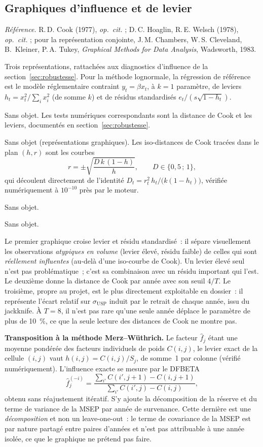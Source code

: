 \documentclass[a4paper,11pt]{article}
\newcommand{\refl}[1]{{\small\textcolor{maincolor!70!black}{\textit{Référence.} #1}}\par\smallskip}
\newcounter{ficheid}
\newenvironment{fiche}[1]{%
  \stepcounter{ficheid}%
  \phantomsection
  \subsection{#1}%
  \label{fiche:\theficheid}%
}{%
  \end{description}\vspace{0.5em}%
}
\newcommand{\Cadre}{%
  \begin{description}[leftmargin=0pt, style=unboxed, itemsep=3pt, topsep=3pt, parsep=2pt]%
  \item[\textcolor{financeblue}{\textbf{1. Cadre, notations et hypothèses de validité (non testées).}}]}
\newcommand{\Hzero}{\item[\textcolor{financeblue}{\textbf{2. Hypothèse nulle.}}]}
\newcommand{\Stat}{\item[\textcolor{financeblue}{\textbf{3. Statistique de test.}}]}
\newcommand{\Loi}{\item[\textcolor{financeblue}{\textbf{4. Loi sous $H_0$.}}]}
\newcommand{\Pval}{\item[\textcolor{financeblue}{\textbf{5. p-value.}}]}
\newcommand{\Usage}{\item[\textcolor{financeblue}{\textbf{6. Usage et limites.}}]}
\begin{document}
\begin{fiche}{Graphiques d'influence et de levier}
\refl{R.\,D. Cook (1977), \emph{op.\ cit.} ; D.\,C. Hoaglin, R.\,E. Welsch (1978),
\emph{op.\ cit.} ; pour la représentation conjointe, J.\,M. Chambers,
W.\,S. Cleveland, B.~Kleiner, P.\,A. Tukey, \emph{Graphical Methods for Data
Analysis}, Wadsworth, 1983.}
\Cadre
Trois représentations, rattachées aux diagnostics d'influence de la
section~\ref{sec:robustesse}. Pour la méthode lognormale, la régression de
référence est le modèle réglementaire contraint $y_t = \beta x_t$, à $k = 1$
paramètre, de leviers $h_t = x_t^2 / \sum_i x_i^2$ (de somme $k$) et de résidus
standardisés $e_t / (s\sqrt{1-h_t})$.
\Hzero
Sans objet. Les tests numériques correspondants sont la distance de Cook et les
leviers, documentés en section~\ref{sec:robustesse}.
\Stat
Sans objet (représentations graphiques). Les iso-distances de Cook tracées dans
le plan $(h, r)$ sont les courbes
\[
  r = \pm\sqrt{\frac{D\,k\,(1-h)}{h}}, \qquad D \in \{0{,}5\,;\,1\},
\]
qui découlent directement de l'identité $D_t = r_t^2\,h_t / \big(k(1-h_t)\big)$,
vérifiée numériquement à $10^{-10}$ près par le moteur.
\Loi
Sans objet.
\Pval
Sans objet.
\Usage
Le premier graphique croise levier et résidu standardisé~: il sépare visuellement
les observations \emph{atypiques en volume} (levier élevé, résidu faible) de
celles qui sont \emph{réellement influentes} (au-delà d'une iso-courbe de Cook).
Un levier élevé seul n'est pas problématique~; c'est sa combinaison avec un
résidu important qui l'est. Le deuxième donne la distance de Cook par année avec
son seuil $4/T$. Le troisième, propre au projet, est le plus directement
exploitable en dossier~: il représente l'écart relatif sur $\sigma_{\mathrm{USP}}$
induit par le retrait de chaque année, issu du jackknife. À $T = 8$, il n'est pas
rare qu'une seule année déplace le paramètre de plus de 10~\%, ce que la seule
lecture des distances de Cook ne montre pas.

\medskip
\textbf{Transposition à la méthode Merz--Wüthrich.} Le facteur $\hat f_j$ étant
une moyenne pondérée des facteurs individuels de poids $C(i,j)$, le levier exact
de la cellule $(i,j)$ vaut $h(i,j) = C(i,j)/S_j$, de somme~1 par colonne
(vérifié numériquement). L'influence exacte se mesure par le DFBETA
\[
  \hat f_j^{(-i)} = \frac{\sum_{i'} C(i',j+1) - C(i,j+1)}{\sum_{i'} C(i',j) - C(i,j)},
\]
obtenu sans réajustement itératif. S'y ajoute la décomposition de la réserve et du
terme de variance de la MSEP par année de survenance. Cette dernière est une
\emph{décomposition} et non un leave-one-out~: le terme de covariance de la MSEP
est par nature partagé entre paires d'années et n'est pas attribuable à une année
isolée, ce que le graphique ne prétend pas faire.
\end{fiche}
\end{document}
